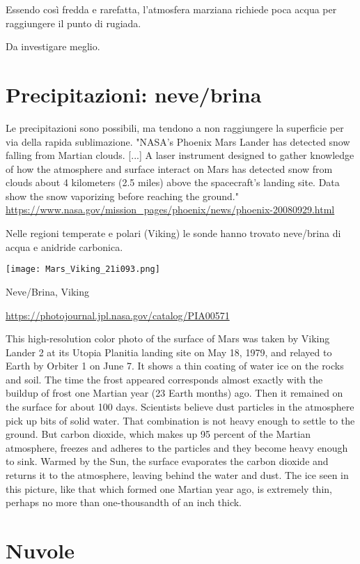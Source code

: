 \documentclass[a4paper,10pt,openany,oneside]{memoir}
\begin{document}
Essendo così fredda e rarefatta, l'atmosfera marziana richiede poca acqua per raggiungere il punto di rugiada.

Da investigare meglio.


\section{Precipitazioni: neve/brina}

Le precipitazioni sono possibili, ma tendono a non raggiungere la superficie per via della rapida sublimazione. "NASA's Phoenix Mars Lander has detected snow falling from Martian clouds. [...] A laser instrument designed to gather knowledge of how the atmosphere and surface interact on Mars has detected snow from clouds about 4 kilometers (2.5 miles) above the spacecraft's landing site. Data show the snow vaporizing before reaching the ground." \url{https://www.nasa.gov/mission_pages/phoenix/news/phoenix-20080929.html}

Nelle regioni temperate e polari (Viking) le sonde hanno trovato neve/brina di acqua e anidride carbonica.

\texttt{[image: Mars\_Viking\_21i093.png]}

Neve/Brina, Viking

\url{https://photojournal.jpl.nasa.gov/catalog/PIA00571}


This high-resolution color photo of the surface of Mars was taken by Viking Lander 2 at its Utopia Planitia landing site on May 18, 1979, and relayed to Earth by Orbiter 1 on June 7. It shows a thin coating of water ice on the rocks and soil. The time the frost appeared corresponds almost exactly with the buildup of frost one Martian year (23 Earth months) ago. Then it remained on the surface for about 100 days. Scientists believe dust particles in the atmosphere pick up bits of solid water. That combination is not heavy enough to settle to the ground. But carbon dioxide, which makes up 95 percent of the Martian atmosphere, freezes and adheres to the particles and they become heavy enough to sink. Warmed by the Sun, the surface evaporates the carbon dioxide and returns it to the atmosphere, leaving behind the water and dust. The ice seen in this picture, like that which formed one Martian year ago, is extremely thin, perhaps no more than one-thousandth of an inch thick.

\section{Nuvole}
\end{document}
